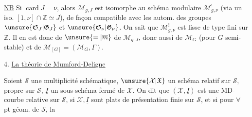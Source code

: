 \uline{NB} Si $\operatorname{card}J=\nu$, alors $\mathcal M_{g,J}$ est isomorphe au schéma modulaire $\mathcal M^!_{g,\nu}$ (via un iso. $[1,\nu]\cap\mathbb Z\simeq J$), de façon compatible avec les autom. des groupes $\unsure{\mathfrak S_J|\mathfrak G_J}$ et $\unsure{\mathfrak S_\nu|\mathfrak G_\nu}$. On sait que $\mathcal M^!_{g,\nu}$ est lisse de type fini sur $\mathbb Z$. Il en est donc de $\unsure{=|\overline m}$ de $\mathcal M_{g,J}$, donc aussi de $\mathcal M_G$ (pour $G$ semi-stable) et de $\mathcal M_{[G]}=(\mathcal M_G,\Gamma)$.

4. \uline{La théorie de Mumford-Deligne}

Soient $\mathcal S$ une multiplicité schématique, $\unsure{\mathcal X|\mathfrak X}$ un  schéma relatif sur $\mathcal S$, propre sur $\mathcal S$, $\underline I$ un sous-schéma fermé de $\mathcal X$. On dit que $(\mathcal X,\underline I)$ est une MD-courbe relative sur $\mathcal S$, si $\mathcal X,\underline I$ sont plats de présentation finie sur $\mathcal S$, et si pour $\forall$ pt géom. de $\mathcal S$, la
